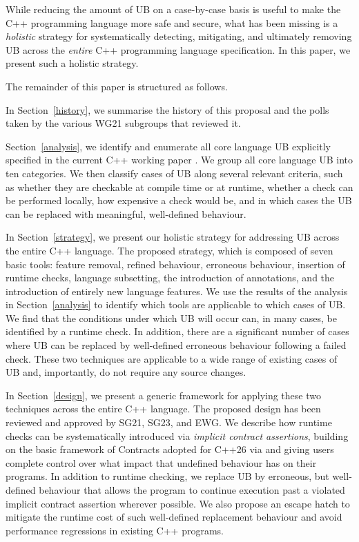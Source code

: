 While reducing the amount of UB on a case-by-case basis is useful to make the C++ programming language more safe and secure, what has been missing is a \emph{holistic} strategy for systematically detecting, mitigating, and ultimately removing UB across the \emph{entire} C++ programming language specification. In this paper, we present such a holistic strategy. 

The remainder of this paper is structured as follows. 

In Section~\ref{history}, we summarise the history of this proposal and the polls taken by the various WG21 subgroups that reviewed it.

Section~\ref{analysis}, we identify and enumerate all core language UB explicitly specified in the current C++ working paper \cite{N5008}. We group all core language UB into ten categories. We then classify cases of UB along several relevant criteria, such as whether they are checkable at compile time or at runtime, whether a check can be performed locally, how expensive a check would be, and in which cases the UB can be replaced with meaningful, well-defined behaviour.

In Section~\ref{strategy}, we present our holistic strategy for addressing UB across the entire C++ language. The proposed strategy, which is composed of seven basic tools: feature removal, refined behaviour, erroneous behaviour, insertion of runtime checks, language subsetting, the introduction of annotations, and the introduction of entirely new language features. We use the results of the analysis in Section~\ref{analysis} to identify which tools are applicable to which cases of UB. We find that the conditions under which UB will occur can, in many cases, be identified by a runtime check. In addition, there are a significant number of cases where UB can be replaced by well-defined erroneous behaviour following a failed check. These two techniques are applicable to a wide range of existing cases of UB and, importantly, do not require any source changes.

In Section~\ref{design}, we present a generic framework for applying these two techniques across the entire C++ language. The proposed design has been reviewed and approved by SG21, SG23, and EWG. We describe how runtime checks can be systematically introduced via \emph{implicit contract assertions}, building on the basic framework of Contracts adopted for C++26 via \cite{P2900R14} and giving users complete control over what impact that undefined behaviour has on their programs. In addition to runtime checking, we replace UB by erroneous, but well-defined behaviour that allows the program to continue execution past a violated implicit contract assertion wherever possible. We also propose an escape hatch to mitigate the runtime cost of such well-defined replacement behaviour and avoid performance regressions in existing C++ programs.

